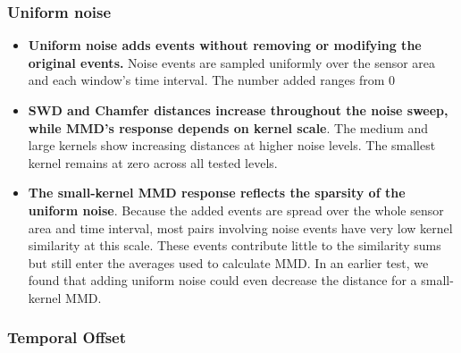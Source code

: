 \subsubsection{Uniform noise}

\begin{itemize}
    \item \textbf{Uniform noise adds events without removing or modifying the original events.} Noise events are sampled uniformly over the sensor area and each window’s time interval. The number added ranges from 0%

    \item \textbf{SWD and Chamfer distances increase throughout the noise sweep, while MMD’s response depends on kernel scale}. The medium and large kernels show increasing distances at higher noise levels. The smallest kernel remains at zero across all tested levels.

    \item \textbf{The small-kernel MMD response reflects the sparsity of the uniform noise}. Because the added events are spread over the whole sensor area and time interval, most pairs involving noise events have very low kernel similarity at this scale. These events contribute little to the similarity sums but still enter the averages used to calculate MMD. In an earlier test, we found that adding uniform noise could even decrease the distance for a small-kernel MMD.
\end{itemize}

\subsubsection{Temporal Offset}

